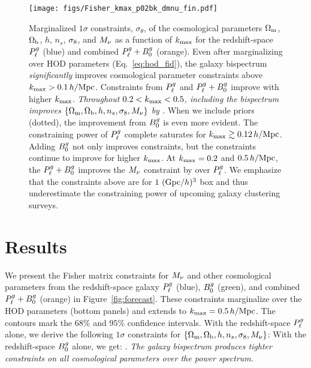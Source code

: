 \begin{figure}
    \begin{center}
        \texttt{[image: figs/Fisher\_kmax\_p02bk\_dmnu\_fin.pdf]}
        \caption{Marginalized $1\sigma$ constraints, $\sigma_\theta$, of the
        cosmological parameters $\Omega_{\rm m}$, $\Omega_{\rm b}$, $h$, $n_s$, $\sigma_8$, and $M_\nu$
        as a function of $k_{\rm max}$ for the redshift-space $P^g_{\ell}$ (blue)
        and combined $P^g_{\ell} + B^g_0$ (orange). Even after marginalizing over
        HOD parameters (Eq.~\ref{eq:hod_fid}), the galaxy bispectrum {\em
        significantly} improves cosmological parameter constraints above
        $k_{\rm max} > 0.1\,h/\mathrm{Mpc}$. Constraints from $P^g_{\ell}$ and
        $P^g_{\ell} + B^g_0$ improve with higher $k_{\rm max}$. {\em Throughout 
        $0.2 < k_{\rm max} < 0.5$, including the bispectrum improves 
        $\{\Omega_{\rm m}, \Omega_{\rm b}, h, n_s, \sigma_8, M_\nu\}$ by .} When we include 
        \planck priors (dotted), the improvement from $B^g_0$ is even more
        evident. The constraining power of $P^g_{\ell}$ complete
        saturates for $k_{\rm max} \gtrsim 0.12\,h/\mathrm{Mpc}$. Adding $B^g_0$ not only 
        improves constraints, but the constraints continue to improve for
        higher $k_{\rm max}$. At $k_{\rm max} = 0.2$ and $0.5\,h/\mathrm{Mpc}$, the $P^g_{\ell}
        + B^g_0$ improves the $M_\nu$ constraint by  over $P^g_{\ell}$. 
        We emphasize that the constraints above are for $1~({\rm Gpc}/h)^3$ box
        and thus underestimate the constraining power of upcoming galaxy
        clustering surveys.
        }
        \label{fig:kmax_forecast}
    \end{center}
\end{figure}

\section{Results} \label{sec:results} 
We present the Fisher matrix constraints for $M_\nu$ and other cosmological
parameters from the redshift-space galaxy $P^g_{\ell}$ (blue), $B^g_0$ (green), and 
combined $P^g_{\ell} + B^g_0$ (orange) in Figure~\ref{fig:forecast}. These
constraints marginalize over the \cite{zheng2007} HOD parameters %
(bottom panels) and extends to $k_{\rm max} = 0.5\,h/\mathrm{Mpc}$. The contours mark the $68\%$ and
$95\%$ confidence intervals. With the redshift-space $P^g_{\ell}$
alone, we derive the following $1\sigma$ constraints for $\{\Omega_{\rm m}, \Omega_{\rm b}, h, n_s,
\sigma_8, M_\nu\}$: 
With the redshift-space $B^g_0$ alone, we get: 
.
{\em The galaxy bispectrum produces tighter constraints on all cosmological
parameters over the power spectrum}.


